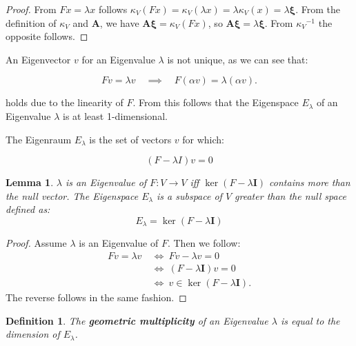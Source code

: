 \documentclass[a4paper,12pt]{article}
\newcommand{\I}{\mat{I}}
\newcommand{\A}{\mat{A}}
\newcommand{\Er}{E_{\lambda}}
\newcommand{\mat}[1]{\mathbf{#1}}
\newcommand{\inv}[1]{{#1}^{-1}}
\let\oldxi\xi
\renewcommand{\xi}{\mathbf{\oldxi}}
\theoremstyle{plain}
\newtheorem{defn}{Definition}[section]
\newtheorem{lemma}{Lemma}[section]
\numberwithin{equation}{section}
\begin{document}
\begin{proof}
    From $F x = \lambda x$ follows $\kappa_{V}(F x) = \kappa_{V}(\lambda x) =
    \lambda \kappa_{V}(x) = \lambda \xi$. From the definition of $\kappa_{V}$ and
    $\A$, we have $\A \xi = \kappa_{V}(F x)$, so $\A \xi = \lambda \xi$.
    From $\inv{\kappa_{V}}$ the opposite follows.
\end{proof}

An Eigenvector $v$ for an Eigenvalue $\lambda$ is not unique, as we can see that:

\begin{equation*}
    F v = \lambda v \quad \implies \quad F (\alpha v) = \lambda (\alpha v).
\end{equation*}

holds due to the linearity of $F$. From this follows that the Eigenspace $\Er$
of an Eigenvalue $\lambda$ is at least 1-dimensional.

The Eigenraum $\Er$ is the set of vectors $v$ for which:

\begin{equation}
    (F - \lambda I) v = 0
\end{equation}

\begin{lemma}
\label{lem:ev-kern}
    $\lambda$ is an Eigenvalue of $F \colon V \rightarrow V$ iff $\ker (F - \lambda \I)$
    contains more than the null vector. The Eigenspace $\Er$ is a
    subspace of $V$ greater than the null space defined as:
    \begin{equation}
        \Er = \ker (F - \lambda \I)
    \end{equation}
\end{lemma}

\begin{proof}
    Assume $\lambda$ is an Eigenvalue of $F$. Then we follow:
    \begin{align*}
        F v = \lambda v \ &\iff \ F v - \lambda v = 0 \\
        &\iff \ (F - \lambda \I) v = 0 \\
        &\iff \ v \in \ker (F - \lambda \I).
    \end{align*}
    The reverse follows in the same fashion.
\end{proof}

\begin{defn}
\label{geo-mult}
    The \textbf{geometric multiplicity} of an Eigenvalue $\lambda$ is equal to
    the dimension of $\Er$.
\end{defn}
\end{document}
